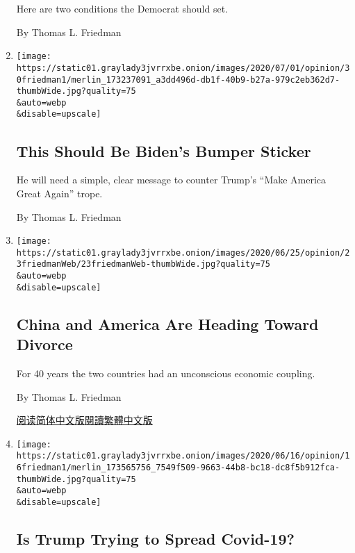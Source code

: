 \begin{enumerate}
  Here are two conditions the Democrat should set.

  By Thomas L. Friedman
\item
  \href{/2020/06/30/opinion/biden-trump-respect.html}{}

  \texttt{[image: https://static01.graylady3jvrrxbe.onion/images/2020/07/01/opinion/30friedman1/merlin\_173237091\_a3dd496d-db1f-40b9-b27a-979c2eb362d7-thumbWide.jpg?quality=75\\\&auto=webp\\\&disable=upscale]}

  \hypertarget{this-should-be-bidens-bumper-sticker}{%
  \subsection{This Should Be Biden's Bumper
  Sticker}\label{this-should-be-bidens-bumper-sticker}}

  He will need a simple, clear message to counter Trump's ``Make America
  Great Again'' trope.

  By Thomas L. Friedman
\item
  \href{/2020/06/23/opinion/china-united-states-trump.html}{}

  \texttt{[image: https://static01.graylady3jvrrxbe.onion/images/2020/06/25/opinion/23friedmanWeb/23friedmanWeb-thumbWide.jpg?quality=75\\\&auto=webp\\\&disable=upscale]}

  \hypertarget{china-and-america-are-heading-toward-divorce}{%
  \subsection{China and America Are Heading Toward
  Divorce}\label{china-and-america-are-heading-toward-divorce}}

  For 40 years the two countries had an unconscious economic coupling.

  By Thomas L. Friedman

  \href{https://cn.nytimes3xbfgragh.onion/opinion/20200624/china-united-states-trump/}{阅读简体中文版}\href{https://cn.nytimes3xbfgragh.onion/opinion/20200624/china-united-states-trump/zh-hant/}{閱讀繁體中文版}
\item
  \href{/2020/06/16/opinion/trump-coronavirus.html}{}

  \texttt{[image: https://static01.graylady3jvrrxbe.onion/images/2020/06/16/opinion/16friedman1/merlin\_173565756\_7549f509-9663-44b8-bc18-dc8f5b912fca-thumbWide.jpg?quality=75\\\&auto=webp\\\&disable=upscale]}

  \hypertarget{is-trump-trying-to-spread-covid-19}{%
  \subsection{Is Trump Trying to Spread
  Covid-19?}\label{is-trump-trying-to-spread-covid-19}}


\end{enumerate}

